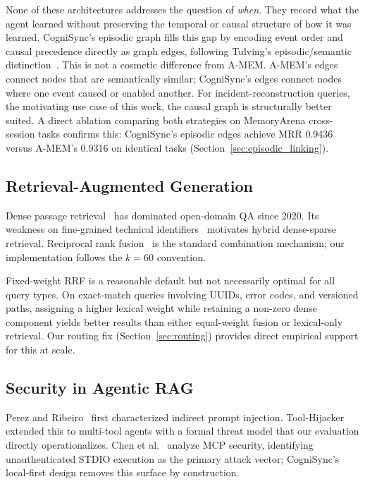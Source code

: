 \documentclass[sigconf,authordraft]{acmart}
\begin{document}
None of these architectures addresses the question of \emph{when}. They
record what the agent learned without preserving the temporal or causal
structure of how it was learned. CogniSync's episodic graph fills this
gap by encoding event order and causal precedence directly as graph edges,
following Tulving's episodic/semantic distinction~\cite{tulving1972}.
This is not a cosmetic difference from A-MEM. A-MEM's edges connect nodes
that are semantically similar; CogniSync's edges connect nodes where one
event caused or enabled another. For incident-reconstruction queries,
the motivating use case of this work, the causal graph is structurally
better suited. A direct ablation comparing both strategies on MemoryArena
cross-session tasks confirms this: CogniSync's episodic edges achieve
MRR 0.9436 versus A-MEM's 0.9316 on identical tasks
(Section~\ref{sec:episodic_linking}).

\subsection{Retrieval-Augmented Generation}

Dense passage retrieval~\cite{karpukhin2020dpr} has dominated open-domain
QA since 2020. Its weakness on fine-grained technical
identifiers~\cite{zhao2022dense} motivates hybrid dense-sparse retrieval.
Reciprocal rank fusion~\cite{cormack2009rrf} is the standard combination
mechanism; our implementation follows the $k{=}60$ convention.

Fixed-weight RRF is a reasonable default but not necessarily optimal for
all query types. On exact-match queries involving UUIDs, error codes, and
versioned paths, assigning a higher lexical weight while retaining a
non-zero dense component yields better results than either equal-weight
fusion or lexical-only retrieval. Our routing fix (Section~\ref{sec:routing})
provides direct empirical support for this at scale.

\subsection{Security in Agentic RAG}

Perez and Ribeiro~\cite{perez2022injection} first characterized indirect
prompt injection. Tool-Hijacker~\cite{hui2024toolhijacker} extended this
to multi-tool agents with a formal threat model that our evaluation
directly operationalizes. Chen et al.~\cite{chen2025mcp} analyze MCP
security, identifying unauthenticated STDIO execution as the primary
attack vector; CogniSync's local-first design removes this surface by
construction.
\end{document}
